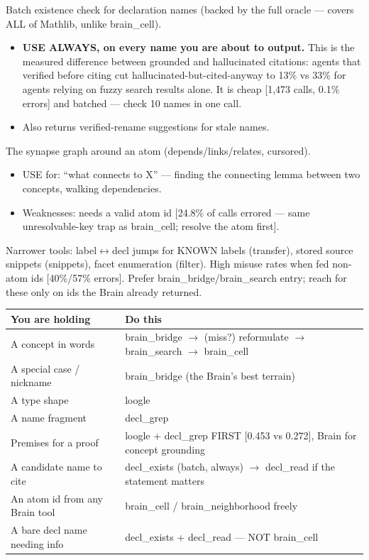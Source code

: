 \documentclass[10pt]{article}
\begin{document}
Batch existence check for declaration names (backed by the full
oracle --- covers ALL of Mathlib, unlike brain\_cell).
\begin{itemize}
\item \textbf{USE ALWAYS, on every name you are about to output.} This
  is the measured difference between grounded and hallucinated
  citations: agents that verified before citing cut
  hallucinated-but-cited-anyway to 13\% vs 33\% for agents relying on
  fuzzy search results alone. It is cheap [1,473 calls, 0.1\% errors]
  and batched --- check 10 names in one call.
\item Also returns verified-rename suggestions for stale names.
\end{itemize}

The synapse graph around an atom (depends/links/relates, cursored).
\begin{itemize}
\item USE for: ``what connects to X'' --- finding the connecting lemma
  between two concepts, walking dependencies.
\item Weaknesses: needs a valid atom id [24.8\% of calls errored ---
  same unresolvable-key trap as brain\_cell; resolve the atom first].
\end{itemize}

Narrower tools: label$\leftrightarrow$decl jumps for KNOWN labels
(transfer), stored source snippets (snippets), facet enumeration
(filter). High misuse rates when fed non-atom ids [40\%/57\% errors].
Prefer brain\_bridge/brain\_search entry; reach for these only on ids
the Brain already returned.


\begin{center}\footnotesize
\begin{tabular}{@{}p{}p{}@{}}
\toprule
You are holding & Do this \\
\midrule
A concept in words & brain\_bridge $\to$ (miss?) reformulate $\to$ brain\_search $\to$ brain\_cell \\
A special case / nickname & brain\_bridge (the Brain's best terrain) \\
A type shape & loogle \\
A name fragment & decl\_grep \\
Premises for a proof & loogle + decl\_grep FIRST [0.453 vs 0.272], Brain for concept grounding \\
A candidate name to cite & decl\_exists (batch, always) $\to$ decl\_read if the statement matters \\
An atom id from any Brain tool & brain\_cell / brain\_neighborhood freely \\
A bare decl name needing info & decl\_exists + decl\_read --- NOT brain\_cell \\
\bottomrule
\end{tabular}
\end{center}
\end{document}
